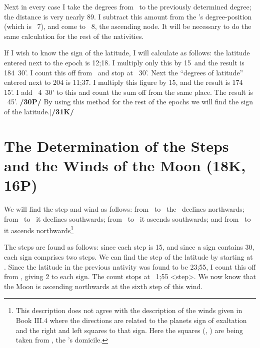 Next in every case I take the degrees from \Taurus\, to the previously determined degree; the distance is very nearly 89\deg. I subtract this amount from the \Moon’s degree-position (which is \Scorpio\, 7\deg), and come to \Leo\, 8\deg, the ascending node. It will be necessary to do the same calculation for the rest of the nativities.

If I wish to know the sign of the latitude, I will calculate as follows: the latitude entered next to the epoch is 12;18. I multiply only this by 15\deg\, and the result is 184\deg\, 30'. I count this off from \Leo\, and stop
at \deg\, 30'. Next the “degrees of latitude” entered next to 204 is 11;37. I multiply this figure by
15\deg, and the result is 174\deg\, 15'. I add \Aquarius\, 4\deg\, 30' to this and count the sum off from the same place. The result is \deg\, 45'. \textbf{/30P/} By using this method for the rest of the epochs we will find the sign of the latitude.]\textbf{/31K/}

\newpage
\section{The Determination of the Steps and the Winds of the Moon (18K, 16P)}
We will find the step and wind as follows: from \Leo\, to \Libra\, the \Moon\, declines northwards; from \Scorpio\, to \Capricorn\, it declines southwards; from \Aquarius\, to \Aries\, it ascends southwards; and from \Taurus\, to \Cancer\, it ascends northwards\footnote{This description does not agree with the description of the winds given in Book III.4 where the directions are related to the planets sign of exaltation and the right and left squares to that sign. Here the squares (\Libra, \Aries) are being taken from \Cancer, the \Moon's domicile.}

The steps are found as follows: since each step is 15\deg, and since a sign contains 30\deg, each sign comprises two steps. We can find the step of the latitude by starting at \Leo. Since the latitude in the previous nativity was found to be 23;55, I count this off from \Leo, giving 2 to each sign. The count stops at \Cancer\, 1;55 <step>. We now know that the Moon is ascending northwards at the sixth step of this wind.

\newpage